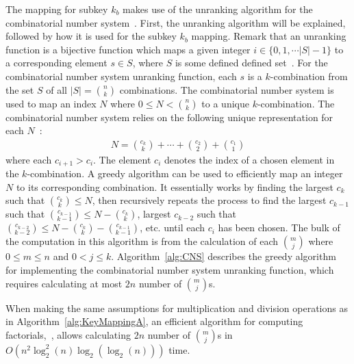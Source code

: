 The mapping for subkey $k_b$ makes use of the unranking algorithm for the combinatorial number system~\cite{CNSlectureNotes}. First, the unranking algorithm will be explained, followed by how it is used for the subkey $k_b$ mapping. Remark that an unranking function is a bijective function which maps a given integer $i \in \{0, 1, \cdots \lvert S \rvert - 1\}$ to a corresponding element $s \in S$, where $S$ is some defined defined set~\cite{shimizu2014unranking}. For the combinatorial number system unranking function, each $s$ is a $k$-combination from the set $S$ of all $\lvert S \rvert = {n \choose k}$ combinations. The combinatorial number system is used to map an index $N$ where $0 \leq N < {n \choose k}$ to a unique $k$-combination. The combinatorial number system relies on the following unique representation for each $N$~\cite{siddique2016proof}:
\begin{align}
N={c_{k} \choose k}+\cdots+{c_{2} \choose 2}+{c_{1} \choose 1}
\end{align}
where each $c_{i+1} > c_i$. The element $c_i$ denotes the index of a chosen element in the $k$-combination. A greedy algorithm can be used to efficiently map an integer $N$ to its corresponding combination. It essentially works by finding the largest $c_k$ such that ${c_k \choose k} \leq N$, then recursively repeats the process to find the largest $c_{k-1}$ such that ${c_{k-1} \choose k-1} \leq N - {c_k \choose k}$, largest $c_{k-2}$ such that ${c_{k-2} \choose k-2} \leq N - {c_k \choose k} - {c_{k-1} \choose k-1}$, etc. until each $c_i$ has been chosen. The bulk of the computation in this algorithm is from the calculation of each ${m \choose j}$ where $0 \leq m \leq n$ and $0 < j \leq k$. Algorithm~\ref{alg:CNS} describes the greedy algorithm for implementing the combinatorial number system unranking function, which requires calculating at most $2n$ number of ${m \choose j}$s.
\begin{theorem}
When making the same assumptions for multiplication and division operations as in Algorithm~\ref{alg:KeyMappingA}, an efficient algorithm for computing factorials,~\cite{borwein1985complexity}, allows calculating $2n$ number of ${m \choose j}$s in $O\left(n^2 \log_2^2 (n) \log_2(\log_2 (n))\right)$ time.
\end{theorem}
